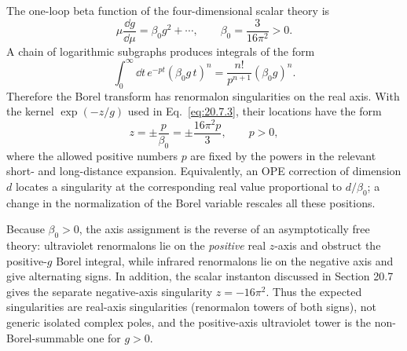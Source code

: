 \begin{enumerate}
  The one-loop beta function of the four-dimensional scalar theory is
  \[
    \mu\frac{\dd g}{\dd\mu}=\beta_0g^2+\cdots,\qquad
    \beta_0=\frac{3}{16\pi^2}>0.
  \]
  A chain of logarithmic subgraphs produces integrals of the form
  \[
    \int_0^\infty \dd t\,e^{-pt}
      (\beta_0g\,t)^n
      =\frac{n!}{p^{n+1}}(\beta_0g)^n .
  \]
  Therefore the Borel transform has renormalon singularities on the real
  axis.  With the kernel \(\exp(-z/g)\) used in
  Eq.~\eqref{eq:20.7.3}, their locations have the form
  \[
    z=\pm\frac{p}{\beta_0}
      =\pm\frac{16\pi^2p}{3},
    \qquad p>0,
  \]
  where the allowed positive numbers \(p\) are fixed by the powers in the
  relevant short- and long-distance expansion.  Equivalently, an OPE
  correction of dimension \(d\) locates a singularity at the
  corresponding real value proportional to \(d/\beta_0\); a change in
  the normalization of the Borel variable rescales all these positions.

  Because \(\beta_0>0\), the axis assignment is the reverse of an
  asymptotically free theory: ultraviolet renormalons lie on the
  \emph{positive} real \(z\)-axis and obstruct the positive-\(g\) Borel
  integral, while infrared renormalons lie on the negative axis and give
  alternating signs.  In addition, the scalar instanton discussed in
  Section 20.7 gives the separate negative-axis singularity
  \(z=-16\pi^2\).  Thus the expected singularities are real-axis
  singularities (renormalon towers of both signs), not generic isolated
  complex poles, and the positive-axis ultraviolet tower is the
  non-Borel-summable one for \(g>0\).
\end{enumerate}

